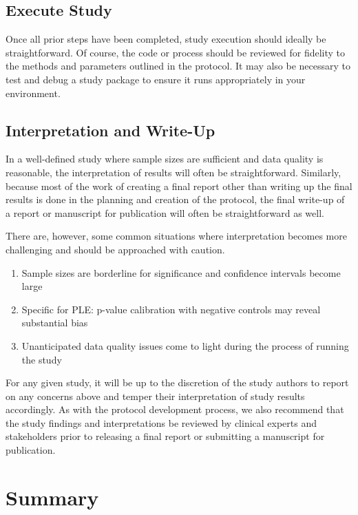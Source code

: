 \documentclass[11pt]{book}
\providecommand{\tightlist}{%
  \setlength{\itemsep}{0pt}\setlength{\parskip}{0pt}}
\theoremstyle{definition}
\theoremstyle{definition}
\theoremstyle{definition}
\theoremstyle{remark}
\begin{document}
\subsection{Execute Study}\label{execute-study}

Once all prior steps have been completed, study execution should ideally
be straightforward. Of course, the code or process should be reviewed
for fidelity to the methods and parameters outlined in the protocol. It
may also be necessary to test and debug a study package to ensure it
runs appropriately in your environment.

\subsection{Interpretation and
Write-Up}\label{interpretation-and-write-up}

In a well-defined study where sample sizes are sufficient and data
quality is reasonable, the interpretation of results will often be
straightforward. Similarly, because most of the work of creating a final
report other than writing up the final results is done in the planning
and creation of the protocol, the final write-up of a report or
manuscript for publication will often be straightforward as well.

There are, however, some common situations where interpretation becomes
more challenging and should be approached with caution.

\begin{enumerate}
\def\labelenumi{\arabic{enumi}.}
\tightlist
\item
  Sample sizes are borderline for significance and confidence intervals
  become large
\item
  Specific for PLE: p-value calibration with negative controls may
  reveal substantial bias
\item
  Unanticipated data quality issues come to light during the process of
  running the study
\end{enumerate}

For any given study, it will be up to the discretion of the study
authors to report on any concerns above and temper their interpretation
of study results accordingly. As with the protocol development process,
we also recommend that the study findings and interpretations be
reviewed by clinical experts and stakeholders prior to releasing a final
report or submitting a manuscript for publication.

\section{Summary}\label{summary-13}
\end{document}
